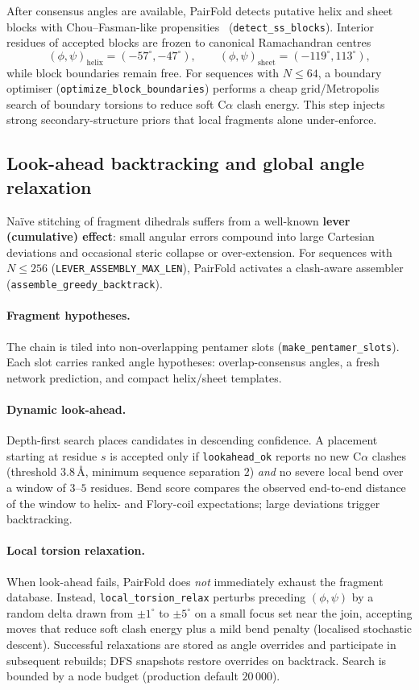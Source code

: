 \documentclass[11pt,a4paper]{article}
\begin{document}
After consensus angles are available, PairFold detects putative helix and sheet blocks with Chou--Fasman-like propensities~\citep{chou1974prediction} (\texttt{detect\_ss\_blocks}).
Interior residues of accepted blocks are frozen to canonical Ramachandran centres
\[
  (\phi,\psi)_{\mathrm{helix}} = (-57^\circ,-47^\circ),\qquad
  (\phi,\psi)_{\mathrm{sheet}} = (-119^\circ,113^\circ),
\]
while block boundaries remain free.
For sequences with $N\le 64$, a boundary optimiser (\texttt{optimize\_block\_boundaries}) performs a cheap grid/Metropolis search of boundary torsions to reduce soft C$\alpha$ clash energy.
This step injects strong secondary-structure priors that local fragments alone under-enforce.

\subsection{Look-ahead backtracking and global angle relaxation}
\label{sec:lever}

Na\"ive stitching of fragment dihedrals suffers from a well-known \textbf{lever (cumulative) effect}: small angular errors compound into large Cartesian deviations and occasional steric collapse or over-extension.
For sequences with $N\le 256$ (\texttt{LEVER\_ASSEMBLY\_MAX\_LEN}), PairFold activates a clash-aware assembler (\texttt{assemble\_greedy\_backtrack}).

\paragraph{Fragment hypotheses.}
The chain is tiled into non-overlapping pentamer slots (\texttt{make\_pentamer\_slots}).
Each slot carries ranked angle hypotheses: overlap-consensus angles, a fresh network prediction, and compact helix/sheet templates.

\paragraph{Dynamic look-ahead.}
Depth-first search places candidates in descending confidence.
A placement starting at residue $s$ is accepted only if \texttt{lookahead\_ok} reports no new C$\alpha$ clashes (threshold $3.8$\,\AA, minimum sequence separation $2$) \emph{and} no severe local bend over a window of $3$--$5$ residues.
Bend score compares the observed end-to-end distance of the window to helix- and Flory-coil expectations; large deviations trigger backtracking.

\paragraph{Local torsion relaxation.}
When look-ahead fails, PairFold does \emph{not} immediately exhaust the fragment database.
Instead, \texttt{local\_torsion\_relax} perturbs preceding $(\phi,\psi)$ by a random delta drawn from $\pm 1^\circ$ to $\pm 5^\circ$ on a small focus set near the join, accepting moves that reduce soft clash energy plus a mild bend penalty (localised stochastic descent).
Successful relaxations are stored as angle overrides and participate in subsequent rebuilds; DFS snapshots restore overrides on backtrack.
Search is bounded by a node budget (production default $20\,000$).
\end{document}
